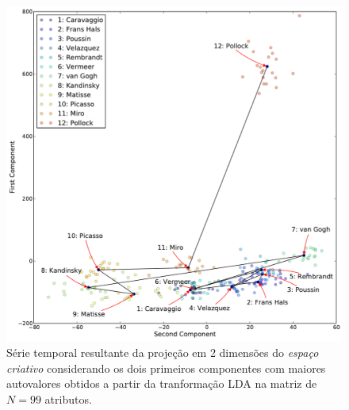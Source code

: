 \begin{figure}[h!]
\begin{center}
        \includegraphics[width=\columnwidth]{figs/caso3_g1}
      \caption{Série temporal resultante da projeção em 2 dimensões do
        \textit{espaço criativo} considerando os dois primeiros componentes com
        maiores autovalores obtidos a partir da tranformação LDA na matriz de
        $N = 99$ atributos.}
        \label{fig:caso3_g1}
\end{center}
\end{figure}

